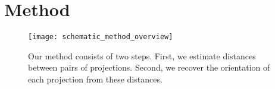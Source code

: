 \section{Method}


\begin{figure}
    \centering
    \texttt{[image: schematic\_method\_overview]}
    \caption{%
        Our method consists of two steps.
        First, we estimate distances between pairs of projections.
        Second, we recover the orientation of each projection from these distances.
    }\label{fig:schematic:method-overview}
\end{figure}

